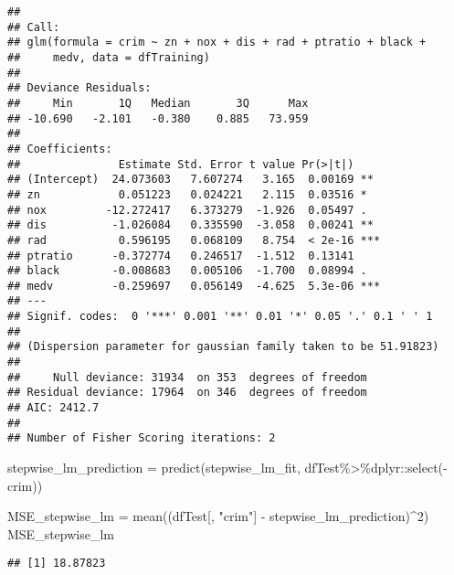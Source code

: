 \documentclass[
]{article}
\newenvironment{Shaded}{\begin{snugshade}}{\end{snugshade}}
\newcommand{\DecValTok}[1]{\textcolor[rgb]{0.00,0.00,0.81}{#1}}
\newcommand{\FunctionTok}[1]{\textcolor[rgb]{0.00,0.00,0.00}{#1}}
\newcommand{\NormalTok}[1]{#1}
\newcommand{\OtherTok}[1]{\textcolor[rgb]{0.56,0.35,0.01}{#1}}
\newcommand{\SpecialCharTok}[1]{\textcolor[rgb]{0.00,0.00,0.00}{#1}}
\newcommand{\StringTok}[1]{\textcolor[rgb]{0.31,0.60,0.02}{#1}}
\begin{document}
\begin{verbatim}
## 
## Call:
## glm(formula = crim ~ zn + nox + dis + rad + ptratio + black + 
##     medv, data = dfTraining)
## 
## Deviance Residuals: 
##     Min       1Q   Median       3Q      Max  
## -10.690   -2.101   -0.380    0.885   73.959  
## 
## Coefficients:
##               Estimate Std. Error t value Pr(>|t|)    
## (Intercept)  24.073603   7.607274   3.165  0.00169 ** 
## zn            0.051223   0.024221   2.115  0.03516 *  
## nox         -12.272417   6.373279  -1.926  0.05497 .  
## dis          -1.026084   0.335590  -3.058  0.00241 ** 
## rad           0.596195   0.068109   8.754  < 2e-16 ***
## ptratio      -0.372774   0.246517  -1.512  0.13141    
## black        -0.008683   0.005106  -1.700  0.08994 .  
## medv         -0.259697   0.056149  -4.625  5.3e-06 ***
## ---
## Signif. codes:  0 '***' 0.001 '**' 0.01 '*' 0.05 '.' 0.1 ' ' 1
## 
## (Dispersion parameter for gaussian family taken to be 51.91823)
## 
##     Null deviance: 31934  on 353  degrees of freedom
## Residual deviance: 17964  on 346  degrees of freedom
## AIC: 2412.7
## 
## Number of Fisher Scoring iterations: 2
\end{verbatim}

\begin{Shaded}
\begin{Highlighting}[]
\NormalTok{stepwise\_lm\_prediction }\OtherTok{=} \FunctionTok{predict}\NormalTok{(stepwise\_lm\_fit, dfTest}\SpecialCharTok{\%\textgreater{}\%}\NormalTok{dplyr}\SpecialCharTok{::}\FunctionTok{select}\NormalTok{(}\SpecialCharTok{{-}}\NormalTok{crim))}

\NormalTok{MSE\_stepwise\_lm }\OtherTok{=} \FunctionTok{mean}\NormalTok{((dfTest[, }\StringTok{"crim"}\NormalTok{] }\SpecialCharTok{{-}}\NormalTok{ stepwise\_lm\_prediction)}\SpecialCharTok{\^{}}\DecValTok{2}\NormalTok{)}
\NormalTok{MSE\_stepwise\_lm}
\end{Highlighting}
\end{Shaded}

\begin{verbatim}
## [1] 18.87823
\end{verbatim}
\end{document}
